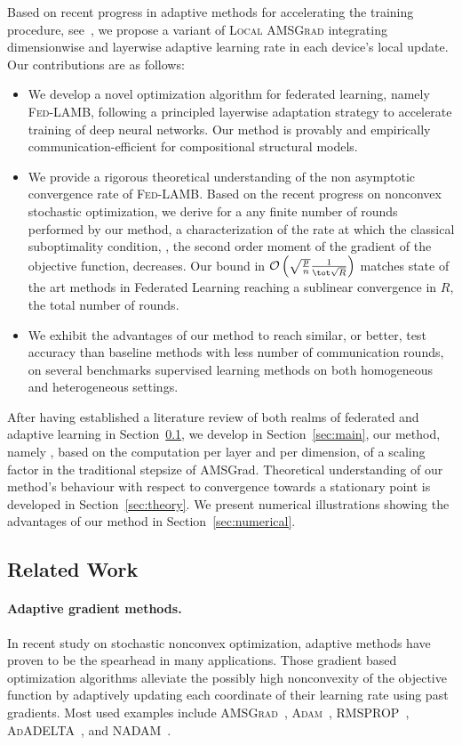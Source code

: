 \documentclass{article}
\begin{document}
Based on recent progress in adaptive methods for accelerating the training procedure, see~\citet{you2019large}, we propose a variant of \textsc{Local AMSGrad} integrating dimensionwise and layerwise adaptive learning rate in each device's local update.
Our contributions are as follows:
\begin{itemize}
\item We develop a novel optimization algorithm for federated learning, namely \textsc{Fed-LAMB}, following a principled layerwise adaptation strategy to accelerate training of deep neural networks. Our method is provably and empirically communication-efficient for compositional structural models.
\item We provide a rigorous theoretical understanding of the non asymptotic convergence rate of \textsc{Fed-LAMB}. Based on the recent progress on nonconvex stochastic optimization, we derive for a any finite number of rounds performed by our method, a characterization of the rate at which the classical suboptimality condition, \ie, the second order moment of the gradient of the objective function, decreases. Our bound  in $\mathcal{O}\left(\sqrt{\frac{ p}{ n}} \frac{1}{\tot \sqrt{R} } \right)$ matches state of the art methods in Federated Learning reaching a sublinear convergence in $R$, the total number of rounds.
\item We exhibit the advantages of our method to reach similar, or better, test accuracy than baseline methods with less number of communication rounds, on several benchmarks supervised learning methods on both homogeneous and heterogeneous settings.
\end{itemize}

After having established a literature review of both realms of federated and adaptive learning in Section~\ref{sec:related}, we develop in Section~\ref{sec:main}, our method, namely \algo, based on the computation per layer and per dimension, of a scaling factor in the traditional stepsize of AMSGrad.
Theoretical understanding of our method's behaviour with respect to convergence towards a stationary point is developed in Section~\ref{sec:theory}.
We present numerical illustrations showing the advantages of our method in Section~\ref{sec:numerical}.

\subsection{Related Work}\label{sec:related}

\paragraph{Adaptive gradient methods.}
In recent study on stochastic nonconvex optimization, adaptive methods have proven to be the spearhead in many applications.
Those gradient based optimization algorithms alleviate the possibly high nonconvexity of the objective function by adaptively updating each coordinate of their learning rate using past gradients. Most used examples include \textsc{AMSGrad}~\citep{RKK18}, \textsc{Adam}~\citep{KB15}, \textsc{RMSPROP}~\citep{TH12}, \textsc{AdADELTA}~\citep{Z12}, and \textsc{NADAM}~\citep{D16}.
\end{document}

